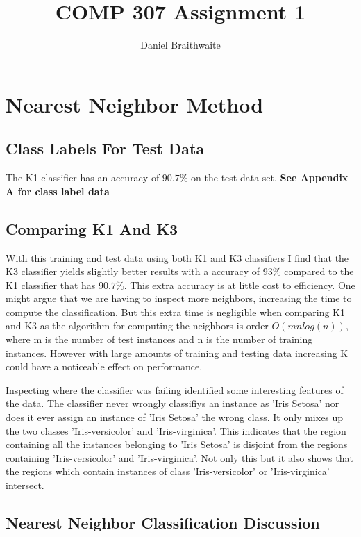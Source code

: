 \documentclass[a4paper, 12pt]{article}
\title{COMP 307 Assignment 1}
\author{Daniel Braithwaite}
\begin{document}
	\maketitle
	\newpage
  	
  	\section{Nearest Neighbor Method}
  		\subsection{Class Labels For Test Data}
			The K1 classifier has an accuracy of $90.7\%$ on the test data set. \textbf{See Appendix A for class label data}
  		
  		\subsection{Comparing K1 And K3}
  			With this training and test data using both K1 and K3 classifiers I find that the K3 classifier yields slightly better results with a accuracy of $93\%$ compared to the K1 classifier that has $90.7\%$. This extra accuracy is at little cost to efficiency. One might argue that we are having to inspect more neighbors, increasing the time to compute the classification. But this extra time is negligible when comparing K1 and K3 as the algorithm for computing the neighbors is order $O(mnlog(n))$, where m is the number of test instances and n is the number of training instances. However with large amounts of training and testing data increasing K could have a noticeable effect on performance.
  			
  			Inspecting where the classifier was failing identified some interesting features of the data. The classifier never wrongly classifiys an instance as 'Iris Setosa' nor does it ever assign an instance of 'Iris Setosa' the wrong class. It only mixes up the two classes 'Iris-versicolor' and 'Iris-virginica'. This indicates that the region containing all the instances belonging to 'Iris Setosa' is disjoint from the regions containing 'Iris-versicolor' and 'Iris-virginica'. Not only this but it also shows that the regions which contain instances of class 'Iris-versicolor' or 'Iris-virginica' intersect.
  			
  		\subsection{Nearest Neighbor Classification Discussion}
			  		
\end{document}
